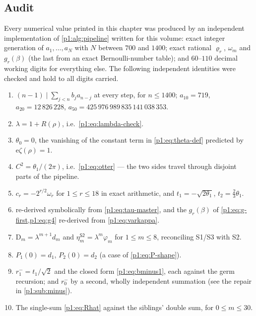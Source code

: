 \documentclass[11pt,a4paper,oneside]{book}
\theoremstyle{plain}
\theoremstyle{definition}
\theoremstyle{remark}
\newcommand{\e}{\mathrm{e}}
\begin{document}
\subsection{Audit}
\label{p1:sub:audit}

Every numerical value printed in this chapter was produced by an independent implementation of
\cref{p1:alg:pipeline} written for this volume: exact integer generation of $a_1,\ldots,a_N$
with $N$ between $700$ and $1400$; exact rational $\varrho_r$, $\omega_m$ and $g_r(\beta)$
(the last from an exact Bernoulli-number table); and $60$--$110$ decimal working digits for
everything else.  The following independent identities were checked and hold to all digits
carried.

\begin{enumerate}
\item $(n-1)\mid\sum_{j<n}b_ja_{n-j}$ at every step, for $n\le1400$;
      $a_{10}=719$, $a_{20}=12\,826\,228$, $a_{50}=425\,976\,989\,835\,141\,038\,353$.
\item $\lambda=1+R(\rho)$, i.e.\ \cref{p1:eq:lambda-check}.
\item $\theta_0=0$, the vanishing of the constant term in
      \cref{p1:eq:theta-def} predicted by $\e\zeta(\rho)=1$.
\item $C^{2}=\theta_1/(2\pi)$, i.e.\ \cref{p1:eq:otter} --- the two sides
      travel through disjoint parts of the pipeline.
\item $c_r=-2^{r/2}\omega_r$ for $1\le r\le18$ in exact arithmetic, and
      $t_1=-\sqrt{2\theta_1}$, $t_2=\tfrac23\theta_1$.
\item {} re-derived symbolically from
      \cref{p1:eq:tau-master}, and the $g_r(\beta)$ of
      \cref{p1:eq:g-first,p1:eq:g4} re-derived from
      \cref{p1:eq:varkappa}.
\item $\mathrm D_m=\lambda^{m+1}d_m$ and
      $\eta^{\textsf{S2}}_m=\lambda^{m}\varphi_m$ for $1\le m\le8$,
      reconciling \textsf{S1}/\textsf{S3} with \textsf{S2}.
\item $P_1(0)=d_1$, $P_2(0)=d_2$ (a case of \cref{p1:eq:P-shape}).
\item $r^-_1=t_1/\sqrt2$ and the closed form \cref{p1:eq:bminus1}, each
      against the germ recursion; and $r^-_0$ by a second, wholly independent
      summation (see the repair in \cref{p1:sub:minus}).
\item The single-sum \cref{p1:eq:Rhat} against the siblings' double sum, for
      $0\le m\le30$.
\end{enumerate}
\end{document}
